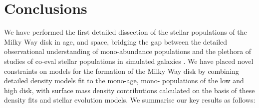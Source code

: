 \section{Conclusions}
\label{sec:conclusionsa}

We have performed the first detailed dissection of the stellar populations of the Milky Way disk in age, \feh{} and \afe{} space, bridging the gap between the detailed observational understanding of mono-abundance populations \citep[e.g.][]{2012ApJ...753..148B,2016ApJ...823...30B} and the plethora of studies of co-eval stellar populations in simulated galaxies \citep[e.g][]{2013ApJ...773...43B,2014MNRAS.442.2474M,2013MNRAS.436..625S}. We have placed novel constraints on models for the formation of the Milky Way disk by combining detailed density models fit to the mono-age, mono-\feh{} populations of the low and high \afe{} disk, with surface mass density contributions calculated on the basis of these density fits and stellar evolution models. We summarise our key results as follows:
